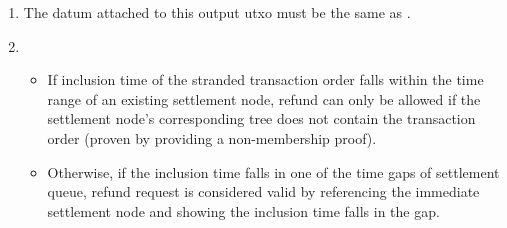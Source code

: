 \documentclass[../midgard.tex]{subfiles}
\begin{document}
\begin{description}
\begin{enumerate}
      \item The datum attached to this output utxo must be the same as .
      \item 
        \begin{itemize}
          \item If inclusion time of the stranded transaction order falls within the time range of an existing settlement node, refund can only be allowed if the settlement node's corresponding tree does not contain the transaction order (proven by providing a non-membership proof).
          \item Otherwise, if the inclusion time falls in one of the time gaps of settlement queue, refund request is considered valid by referencing the immediate settlement node and showing the inclusion time falls in the gap.
        \end{itemize}
    \end{enumerate}
\end{description}
\end{document}
